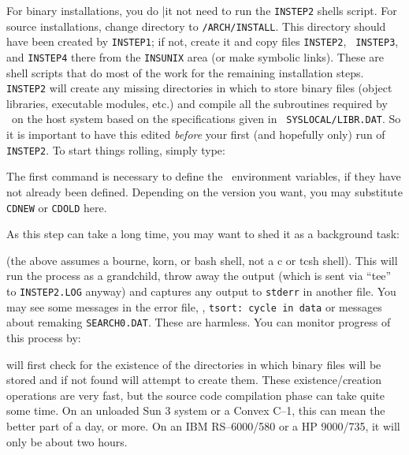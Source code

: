 \medskip



For binary installations, you do {|it not\/} need to run the {\tt INSTEP2}
shells script.  For source installations, change directory to
{\tt\thisver/\dol ARCH/INSTALL}.  This directory should have been created
by {\tt INSTEP1}; if not, create it and copy files {\tt INSTEP2}, {\tt
INSTEP3}, and {\tt INSTEP4} there from the {\tt\dol INSUNIX} area (or make
symbolic links).  These are shell scripts that do most of the work for the
remaining installation steps.  {\tt INSTEP2} will create any missing
directories in which to store binary files (object libraries, executable
modules, etc.) and compile all the subroutines required by \AIPS\ on the
host system based on the specifications given in {\tt\dol
SYSLOCAL/LIBR.DAT}.  So it is important to have this edited {\it before\/}
your first (and hopefully only) run of {\tt INSTEP2}.  To start things
rolling, simply type: \medskip


\medskip
\noindent The first command is necessary to define the
\AIPS\ environment variables, if they have not already been defined.
Depending on the version you want, you may substitute {\tt\dol CDNEW} or
{\tt\dol CDOLD} here.

As this step can take a long time, you may want to shed it as a
background task:\medskip

\medskip

\noindent (the above assumes a bourne, korn, or bash shell, not a c or
tcsh shell).  This will run the process as a grandchild, throw away the
output (which is sent via ``tee'' to {\tt INSTEP2.LOG} anyway) and
captures any output to {\tt stderr} in another file.  You may see some
messages in the error file, \eg, {\tt tsort: cycle in data} or messages
about remaking {\tt SEARCH0.DAT}.  These are harmless.  You can monitor
progress of this process by:\medskip

\medskip

 will first check for the existence of the
directories in which binary files will be stored and if not found will
attempt to create them.  These existence/creation operations are very
fast, but the source code compilation phase can take quite some time.
On an unloaded Sun 3 system or a Convex C--1, this can mean the better
part of a day, or more.  On an IBM RS--6000/580 or a HP 9000/735, it
will only be about two hours.

